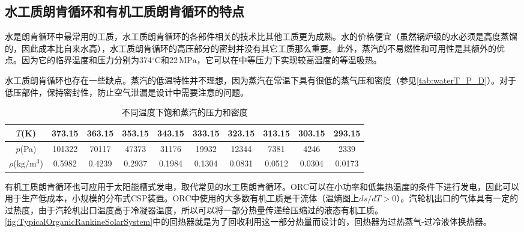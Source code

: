 \subsection{水工质朗肯循环和有机工质朗肯循环的特点}
\label{sec:RankineCycleFluid}

水是朗肯循环中最常用的工质，水工质朗肯循环的各部件相关的技术比其他工质更为成熟。水的价格便宜（虽然锅炉级的水必须是高度蒸馏的，因此成本比自来水高），水工质朗肯循环的高压部分的密封并没有其它工质那么重要。此外，蒸汽的不易燃性和可用性是其额外的优点。因为它的临界温度和压力分别为374$\mathrm{^\circ C}$和22$\,\mathrm{MPa}$，它可以在中等压力下实现较高温度的等温吸热。

水工质朗肯循环也存在一些缺点。蒸汽的低温特性并不理想，因为蒸汽在常温下具有很低的蒸气压和密度（参见\autoref{tab:waterT_P_D}）。对于低压部件，保持密封性，防止空气泄漏是设计中需要注意的问题。
\begin{table}[htbp]
\setlength{\abovecaptionskip}{0pt}
	\caption{不同温度下饱和蒸汽的压力和密度}
	\centering
	\begin{tabular}{cccccccccc}
		\toprule	
		    $T$(K)    &	373.15	    &    363.15    &    353.15    &    343.15    &    333.15    &    323.15    &    313.15    &    303.15    &    293.15\\
		\midrule	
		    $p$(Pa)    &    101322        &    70117    &    47373    &    31176    &    19932    &    12344    &    7381    &    4246    &    2339\\
		    $\rho$($\mathrm{kg/m^3}$)    &    0.5982        &    0.4239    &    0.2937    &    0.1984    &    0.1304    &    0.0831    &    0.0512    &    0.0304    &    0.0173\\
		\bottomrule
	\end{tabular}
	\label{tab:waterT_P_D}
\end{table}

有机工质朗肯循环也可应用于太阳能槽式发电，取代常见的水工质朗肯循环。ORC可以在小功率和低集热温度的条件下进行发电，因此可以用于生产低成本，小规模的分布式CSP装置。ORC中使用的大多数有机工质是干流体（温熵图上$ds/dT > 0$）。汽轮机出口的气体具有一定的过热度，由于汽轮机出口温度高于冷凝器温度，所以可以将一部分热量传递给压缩过的液态有机工质。\autoref{fig:TypicalOrganicRankineSolarSystem}中的回热器就是为了回收利用这一部分热量而设计的，回热器为过热蒸气-过冷液体换热器。

